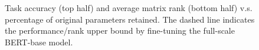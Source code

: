 
\begin{figure}[t]
	\centering
	\caption{Task accuracy (top half) and average matrix rank (bottom half) v.s. percentage of original parameters retained. The dashed line indicates the performance/rank upper bound by fine-tuning the full-scale BERT-base model.}
	\label{fig:pre}
\end{figure}